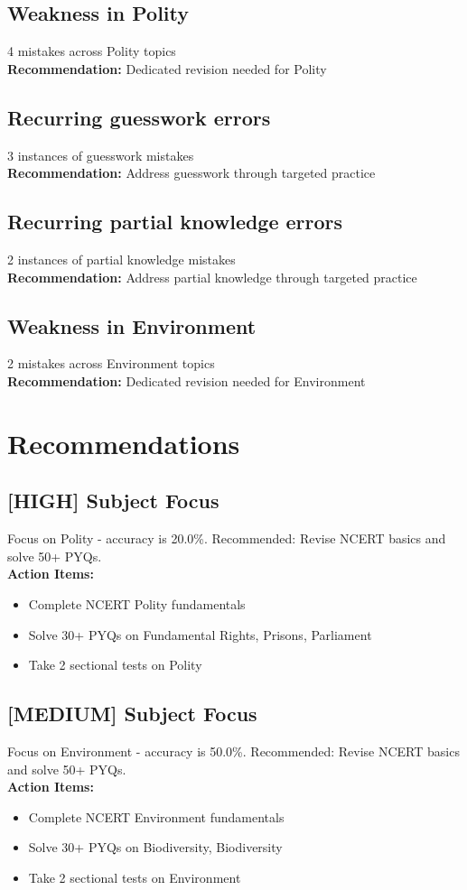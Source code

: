 \documentclass[a4paper,12pt]{article}
\begin{document}
\subsection*{Weakness in Polity}
4 mistakes across Polity topics\\
\textbf{Recommendation:} Dedicated revision needed for Polity\\
\subsection*{Recurring guesswork errors}
3 instances of guesswork mistakes\\
\textbf{Recommendation:} Address guesswork through targeted practice\\
\subsection*{Recurring partial knowledge errors}
2 instances of partial knowledge mistakes\\
\textbf{Recommendation:} Address partial knowledge through targeted practice\\
\subsection*{Weakness in Environment}
2 mistakes across Environment topics\\
\textbf{Recommendation:} Dedicated revision needed for Environment\\
\section{Recommendations}
\subsection*{[HIGH] Subject Focus}
Focus on Polity - accuracy is 20.0\%. Recommended: Revise NCERT basics and solve 50+ PYQs.\\
\textbf{Action Items:}
\begin{itemize}
\item Complete NCERT Polity fundamentals
\item Solve 30+ PYQs on Fundamental Rights, Prisons, Parliament
\item Take 2 sectional tests on Polity
\end{itemize}
\subsection*{[MEDIUM] Subject Focus}
Focus on Environment - accuracy is 50.0\%. Recommended: Revise NCERT basics and solve 50+ PYQs.\\
\textbf{Action Items:}
\begin{itemize}
\item Complete NCERT Environment fundamentals
\item Solve 30+ PYQs on Biodiversity, Biodiversity
\item Take 2 sectional tests on Environment
\end{itemize}
\end{document}
